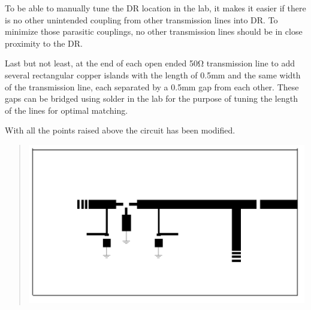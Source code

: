 To be able to manually tune the DR location in the lab, it makes it
easier if there is no other unintended coupling from other transmission
lines into DR. To minimize those parasitic couplings, no other
transmission lines should be in close proximity to the DR.

Last but not least, at the end of each open ended 50Ω transmission line
to add several rectangular copper islands with the length of 0.5mm and
the same width of the transmission line, each separated by a 0.5mm gap
from each other. These gaps can be bridged using solder in the lab for
the purpose of tuning the length of the lines for optimal matching.

With all the points raised above the circuit has been modified.

\begin{quote}
\includegraphics[width=4.79028in,height=2.74931in]{media/image17.png}
\end{quote}

